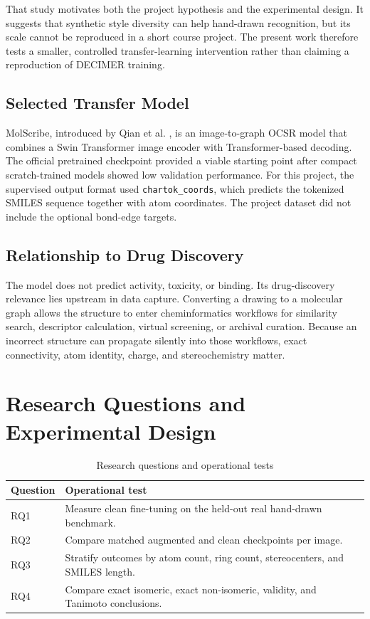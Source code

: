 \documentclass[11pt,a4paper]{article}
\begin{document}
That study motivates both the project hypothesis and the experimental design. It suggests
that synthetic style diversity can help hand-drawn recognition, but its scale cannot be
reproduced in a short course project. The present work therefore tests a smaller, controlled
transfer-learning intervention rather than claiming a reproduction of DECIMER training.

\subsection*{Selected Transfer Model}

MolScribe, introduced by Qian et al. \cite{qian2023}, is an image-to-graph OCSR model that
combines a Swin Transformer image encoder with Transformer-based decoding. The official
pretrained checkpoint provided a viable starting point after compact scratch-trained models
showed low validation performance. For this project, the supervised output format used
\texttt{chartok\_coords}, which predicts the tokenized SMILES sequence together with atom
coordinates. The project dataset did not include the optional bond-edge targets.

\subsection*{Relationship to Drug Discovery}

The model does not predict activity, toxicity, or binding. Its drug-discovery relevance lies
upstream in data capture. Converting a drawing to a molecular graph allows the structure to
enter cheminformatics workflows for similarity search, descriptor calculation, virtual
screening, or archival curation. Because an incorrect structure can propagate silently into
those workflows, exact connectivity, atom identity, charge, and stereochemistry matter.

\section*{Research Questions and Experimental Design}

\begin{table}[H]
\centering
\caption{Research questions and operational tests}
\begin{tabularx}{\textwidth}{C{1.3cm}Y}
\toprule
\textbf{Question} & \textbf{Operational test} \\
\midrule
RQ1 & Measure clean fine-tuning on the held-out real hand-drawn benchmark. \\
RQ2 & Compare matched augmented and clean checkpoints per image. \\
RQ3 & Stratify outcomes by atom count, ring count, stereocenters, and SMILES length. \\
RQ4 & Compare exact isomeric, exact non-isomeric, validity, and Tanimoto conclusions. \\
\bottomrule
\end{tabularx}
\end{table}
\end{document}
